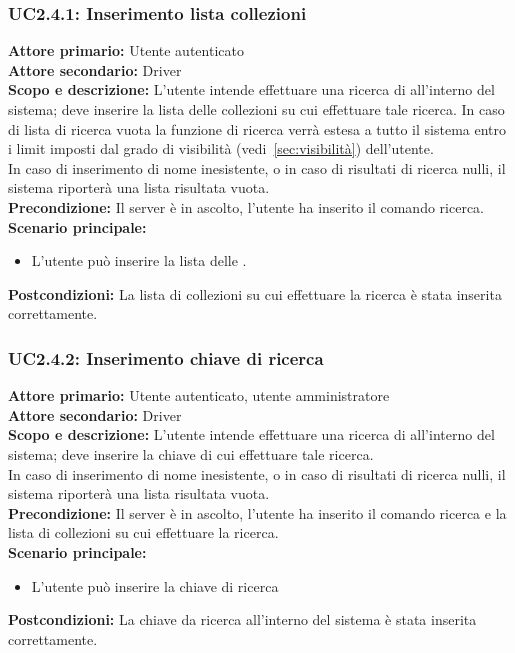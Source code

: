 \documentclass{scalatekids-article}
\begin{document}
\subsubsection{UC2.4.1: Inserimento lista collezioni}

\textbf{Attore primario:} Utente autenticato\\
\textbf{Attore secondario:} Driver\\
\textbf{Scopo e descrizione:} L'utente intende effettuare una ricerca di  all'interno del sistema; deve inserire la lista delle collezioni su cui effettuare tale ricerca. In caso di lista di ricerca vuota
la funzione di ricerca verrà estesa a tutto il sistema entro i limit imposti dal grado di visibilità (vedi~\ref{sec:visibilità}) dell'utente.\\
In caso di inserimento di nome  inesistente, o in caso di risultati di ricerca nulli, il sistema riporterà una lista risultata vuota.\\ %
\textbf{Precondizione:} Il server è in ascolto, l'utente ha inserito il comando ricerca.\\
\textbf{Scenario principale:}
\begin{itemize}
\item L'utente può inserire la lista delle .
\end{itemize}
\textbf{Postcondizioni:} La lista di collezioni su cui effettuare la ricerca è stata inserita correttamente.

\subsubsection{UC2.4.2: Inserimento chiave di ricerca}

\textbf{Attore primario:} Utente autenticato, utente amministratore\\
\textbf{Attore secondario:} Driver\\
\textbf{Scopo e descrizione:} L'utente intende effettuare una ricerca di  all'interno del sistema; deve inserire la chiave di cui effettuare tale ricerca.\\
In caso di inserimento di nome  inesistente, o in caso di risultati di ricerca nulli, il sistema riporterà una lista risultata vuota.\\ %
\textbf{Precondizione:} Il server è in ascolto, l'utente ha inserito il comando ricerca e la lista di collezioni su cui effettuare la ricerca.\\
\textbf{Scenario principale:}
\begin{itemize}
\item L'utente può inserire la chiave di ricerca
\end{itemize}
\textbf{Postcondizioni:} La chiave da ricerca all'interno del sistema è stata inserita correttamente.
\end{document}
